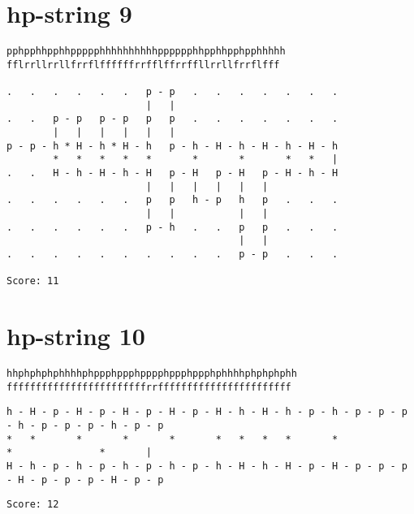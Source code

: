 \documentclass[a4paper,oneside,article,11pt]{memoir}
\begin{document}
\pagebreak

\section*{hp-string 9}
\begin{lstlisting}
pphpphhpphhppppphhhhhhhhhhpppppphhpphhpphpphhhhh
fflrrllrrllfrrflffffffrrfflffrrffllrrllfrrflfff

.   .   .   .   .   .   p - p   .   .   .   .   .   .   .
                        |   |
.   .   p - p   p - p   p   p   .   .   .   .   .   .   .
        |   |   |   |   |   |
p - p - h * H - h * H - h   p - h - H - h - H - h - H - h
        *   *   *   *   *       *       *       *   *   |
.   .   H - h - H - h - H   p - H   p - H   p - H - h - H
                        |   |   |   |   |   |
.   .   .   .   .   .   p   p   h - p   h   p   .   .   .
                        |   |           |   |
.   .   .   .   .   .   p - h   .   .   p   p   .   .   .
                                        |   |
.   .   .   .   .   .   .   .   .   .   p - p   .   .   .

Score: 11
\end{lstlisting}

\section*{hp-string 10}
\begin{lstlisting}
hhphphphphhhhphppphppphpppphppphppphphhhhphphphphh
ffffffffffffffffffffffffrrfffffffffffffffffffffff
\end{lstlisting}
\begin{lstlisting}[basicstyle=\fontsize{6}{11}\ttfamily]
h - H - p - H - p - H - p - H - p - H - h - H - h - p - h - p - p - p - h - p - p - p - h - p - p
*   *       *       *       *       *   *   *   *       *               *               *       |
H - h - p - h - p - h - p - h - p - h - H - h - H - p - H - p - p - p - H - p - p - p - H - p - p
\end{lstlisting}
\begin{lstlisting}
Score: 12
\end{lstlisting}

\pagebreak
\end{document}
